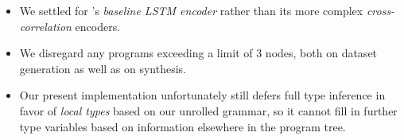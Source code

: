 \documentclass{article} %
\begin{document}
\begin{itemize}
    \item
    We settled for \citet{nsps}'s \emph{baseline LSTM encoder} rather than its more complex \emph{cross-correlation} encoders.


    \item
    We disregard any programs exceeding a limit of 3 nodes, both on dataset generation as well as on synthesis.


    \item
    Our present implementation unfortunately still defers full type inference in favor of \emph{local types} based on our unrolled grammar,
    so it cannot fill in further type variables based on information elsewhere in the program tree.





\end{itemize}
\end{document}

